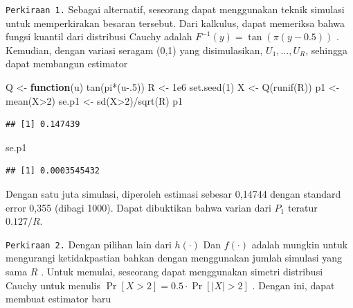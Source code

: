 \documentclass[
]{book}
\newenvironment{Shaded}{\begin{snugshade}}{\end{snugshade}}
\newcommand{\ControlFlowTok}[1]{\textcolor[rgb]{0.13,0.29,0.53}{\textbf{#1}}}
\newcommand{\DecValTok}[1]{\textcolor[rgb]{0.00,0.00,0.81}{#1}}
\newcommand{\FloatTok}[1]{\textcolor[rgb]{0.00,0.00,0.81}{#1}}
\newcommand{\FunctionTok}[1]{\textcolor[rgb]{0.00,0.00,0.00}{#1}}
\newcommand{\NormalTok}[1]{#1}
\newcommand{\OtherTok}[1]{\textcolor[rgb]{0.56,0.35,0.01}{#1}}
\newcommand{\SpecialCharTok}[1]{\textcolor[rgb]{0.00,0.00,0.00}{#1}}
\begin{document}
\texttt{Perkiraan\ 1.} Sebagai alternatif, seseorang dapat menggunakan teknik simulasi untuk memperkirakan besaran tersebut. Dari kalkulus, dapat memeriksa bahwa fungsi kuantil dari distribusi Cauchy adalah \(F^{-1}(y) = \tan \left( \pi(y-0.5) \right)\) . Kemudian, dengan variasi seragam (0,1) yang disimulasikan, \(U_1, \ldots, U_R\), sehingga dapat membangun estimator

\begin{Shaded}
\begin{Highlighting}[]
\NormalTok{Q }\OtherTok{\textless{}{-}} \ControlFlowTok{function}\NormalTok{(u) }\FunctionTok{tan}\NormalTok{(pi}\SpecialCharTok{*}\NormalTok{(u}\FloatTok{{-}.5}\NormalTok{))}
\NormalTok{R }\OtherTok{\textless{}{-}} \FloatTok{1e6}
\FunctionTok{set.seed}\NormalTok{(}\DecValTok{1}\NormalTok{)}
\NormalTok{X }\OtherTok{\textless{}{-}} \FunctionTok{Q}\NormalTok{(}\FunctionTok{runif}\NormalTok{(R))}
\NormalTok{p1 }\OtherTok{\textless{}{-}} \FunctionTok{mean}\NormalTok{(X}\SpecialCharTok{\textgreater{}}\DecValTok{2}\NormalTok{)}
\NormalTok{se.p1 }\OtherTok{\textless{}{-}} \FunctionTok{sd}\NormalTok{(X}\SpecialCharTok{\textgreater{}}\DecValTok{2}\NormalTok{)}\SpecialCharTok{/}\FunctionTok{sqrt}\NormalTok{(R)}
\NormalTok{p1}
\end{Highlighting}
\end{Shaded}

\begin{verbatim}
## [1] 0.147439
\end{verbatim}

\begin{Shaded}
\begin{Highlighting}[]
\NormalTok{se.p1}
\end{Highlighting}
\end{Shaded}

\begin{verbatim}
## [1] 0.0003545432
\end{verbatim}

Dengan satu juta simulasi, diperoleh estimasi sebesar 0,14744 dengan standard error 0,355 (dibagi 1000). Dapat dibuktikan bahwa varian dari \(P_1\) teratur \(0.127/R\).

\texttt{Perkiraan\ 2.} Dengan pilihan lain dari \(h(\cdot)\) Dan \(f(\cdot)\) adalah mungkin untuk mengurangi ketidakpastian bahkan dengan menggunakan jumlah simulasi yang sama \(R\) . Untuk memulai, seseorang dapat menggunakan simetri distribusi Cauchy untuk menulis \(\Pr[X>2]=0.5\cdot\Pr[|X|>2]\) . Dengan ini, dapat membuat estimator baru
\end{document}
